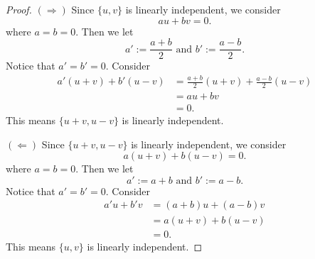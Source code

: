 \begin{Exercise}
	\begin{proof}
		$(\Longrightarrow)$
		Since $\{u,v\}$ is linearly independent, we consider
		$$
		a u+b v = 0.
		$$
		where $a=b=0$. Then we let
		$$
		a' := \frac{a+b}{2}\text{ and } b' := \frac{a-b}{2}.
		$$
		Notice that $a'=b'=0$. Consider
		\begin{align*}
		a' (u+v)+b' (u-v)
		&= \frac{a+b}{2}(u+v) + \frac{a-b}{2}(u-v) \\
		&= a u+b v \\
		&= 0.
		\end{align*}
		This means $\{u+v,u-v\}$ is linearly independent.
		
		\vspace{2ex}
		
		$(\Longleftarrow)$
		Since $\{u+v,u-v\}$ is linearly independent, we consider
		$$
		a (u+v)+b (u-v) = 0.
		$$
		where $a=b=0$. Then we let
		$$
		a' := a+b\text{ and } b' := a-b.
		$$
		Notice that $a'=b'=0$. Consider
		\begin{align*}
		a' u + b' v
		&= (a+b)u + (a-b)v \\
		&= a(u+v)+b(u-v) \\
		&= 0.
		\end{align*}
		This means $\{u,v\}$ is linearly independent.
	\end{proof}
\end{Exercise}